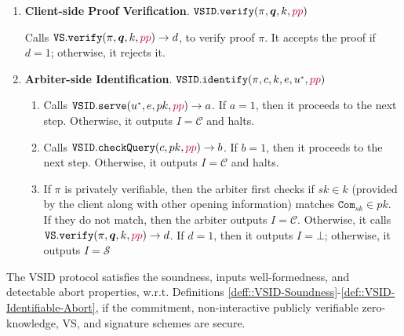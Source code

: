 \begin{enumerate}
\item\textbf{Client-side Proof Verification}. $\mathtt{VSID.verify}(\pi,\bm{q},k,{\color{purple}pp})$

Calls $\mathtt{VS.verify}(\pi,\bm{q},k,{\color{purple}pp})\rightarrow d$, to verify  proof $\pi$. It accepts the proof if $d=1$; otherwise, it rejects it. 




\item\textbf{Arbiter-side Identification}. $\mathtt{VSID.identify}(\pi,c,k,e,u^{\scriptscriptstyle *},{\color{purple}pp})$ 
\begin{enumerate}


\item\label{Arb-VSID.serve} Calls $\mathtt{VSID.serve}(u^{\scriptscriptstyle *},e,pk,{\color{purple}pp})\rightarrow a$. If $a=1$, then it proceeds to the next step. Otherwise, it outputs $I=\mathcal C$ and halts. 

\item Calls $\mathtt{VSID.checkQuery}(c, pk,{\color{purple}pp})\rightarrow b$. If $b=1$, then it proceeds to the next step. Otherwise, it outputs $I=\mathcal C$ and halts. 

\item  If $\pi$ is  privately verifiable, then the arbiter  first checks if $sk\in k$ (provided by the client along with other opening information) matches $\mathtt{Com}_{\scriptscriptstyle sk}\in pk$. If they do not match, then the arbiter outputs $I=\mathcal C$. Otherwise,  it calls $\mathtt{VS.verify}(\pi, \bm{q},k,{\color{purple}pp})\rightarrow d$. If $d=1$, then it outputs $I=\bot$; otherwise, it outputs $I=\mathcal S$
\end{enumerate}
\end{enumerate}




\begin{theorem}
The VSID protocol satisfies the soundness, inputs well-formedness, and detectable abort properties, w.r.t. Definitions \ref{deff::VSID-Soundness}-\ref{def::VSID-Identifiable-Abort}, if the commitment, non-interactive publicly verifiable zero-knowledge, VS, and signature schemes are secure. 
\end{theorem}

